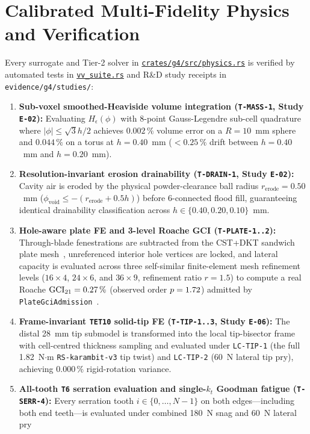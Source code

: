 \documentclass[10pt,journal,letterpaper]{IEEEtran}
\DeclareRobustCommand{\code}[1]{\texorpdfstring{{\nolinkurl{#1}}}{#1}}
\newcommand{\src}[2]{\href{https://github.com/neverhuman/jarambit/blob/v\GFourVersion/#1}{#2}}
\begin{document}
\section{Calibrated Multi-Fidelity Physics and Verification}\label{sec:physics}
Every surrogate and Tier-2 solver in \src{crates/g4/src/physics.rs}{\code{crates/g4/src/physics.rs}} is verified by
automated tests in \src{crates/g4/tests/vv_suite.rs}{\code{vv\_suite.rs}} and R\&D study receipts in \code{evidence/g4/studies/}:
\begin{enumerate}
\item \textbf{Sub-voxel smoothed-Heaviside volume integration (\code{T-MASS-1}, Study \code{E-02}):} Evaluating $H_\epsilon(\phi)$
with 8-point Gauss-Legendre sub-cell quadrature where $|\phi| \le \sqrt{3}h/2$ achieves $0.002\,\%$ volume error on a $R=10$~mm
sphere and $0.044\,\%$ on a torus at $h = 0.40$~mm ($<0.25\,\%$ drift between $h=0.40$~mm and $h=0.20$~mm).
\item \textbf{Resolution-invariant erosion drainability (\code{T-DRAIN-1}, Study \code{E-02}):} Cavity air is eroded by the physical
powder-clearance ball radius $r_{\mathrm{erode}} = 0.50$~mm ($\phi_{\mathrm{void}} \le -(r_{\mathrm{erode}} + 0.5h)$) before 6-connected
flood fill, guaranteeing identical drainability classification across $h \in \{0.40, 0.20, 0.10\}$~mm.
\item \textbf{Hole-aware plate FE and 3-level Roache GCI (\code{T-PLATE-1..2}):} Through-blade fenestrations are subtracted from the
CST+DKT sandwich plate mesh~\cite{batoz1980}, unreferenced interior hole vertices are locked, and lateral capacity is evaluated across
three self-similar finite-element mesh refinement levels ($16\times 4$, $24\times 6$, and $36\times 9$, refinement ratio $r = 1.5$) to compute a real Roache
$\mathrm{GCI}_{21} = 0.27\,\%$ (observed order $p = 1.72$) admitted by \code{PlateGciAdmission}~\cite{roache1998}.
\item \textbf{Frame-invariant \code{TET10} solid-tip FE (\code{T-TIP-1..3}, Study \code{E-06}):} The distal 28~mm tip submodel is
transformed into the local tip-bisector frame with cell-centred thickness sampling and evaluated under \code{LC-TIP-1} (the full
1.82~N$\cdot$m \code{RS-karambit-v3} tip twist) and \code{LC-TIP-2} (60~N lateral tip pry), achieving $0.000\,\%$ rigid-rotation variance.
\item \textbf{All-tooth \code{T6} serration evaluation and single-$k_t$ Goodman fatigue (\code{T-SERR-4}):} Every serration tooth
$i \in \{0,\ldots,N-1\}$ on both edges---including both end teeth---is evaluated under combined 180~N snag and 60~N lateral pry

\end{enumerate}
\end{document}
